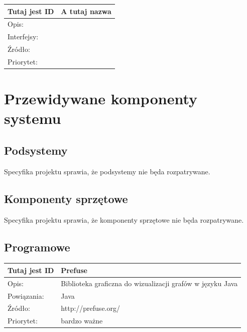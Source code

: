 \documentclass[a4paper,10pt]{article}
\begin{document}
\begin{center}
\begin{tabular}{|p{3cm}|p{9cm}|} \hline

Tutaj jest ID & A tutaj nazwa \\ \hline
Opis: &  \\ \hline
Interfejsy: &  \\ \hline
Źródło: &  \\ \hline
Priorytet: &  \\ \hline

\end{tabular}
\end{center}

\section{Przewidywane komponenty systemu}


\subsection{Podsystemy}
Specyfika projektu sprawia, że podsystemy nie będa rozpatrywane.

\subsection{Komponenty sprzętowe}
Specyfika projektu sprawia, że komponenty sprzętowe nie będa rozpatrywane. 

\subsection{Programowe}

\begin{center}
\begin{tabular}{|p{3cm}|p{9cm}|} \hline

Tutaj jest ID & Prefuse \\ \hline
Opis: &  Biblioteka graficzna do wizualizacji grafów w języku Java\\ \hline
Powiązania: & Java \\ \hline
Źródło: & http://prefuse.org/ \\ \hline
Priorytet: & bardzo ważne \\ \hline

\end{tabular}
\end{center}
\end{document}

